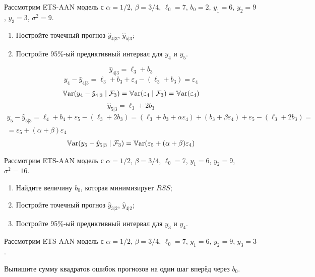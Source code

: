 \begin{problem}
  Рассмотрим ETS-AAN модель с $\alpha = 1/2$, $\beta=3/4$, $\ell_{0}=7$, $b_0=2$, $y_1=6$, $y_2=9$, $y_3=3$, $\sigma^2=9$.
  \begin{enumerate}
    \item Постройте точечный прогноз $\hat y_{4|3}$, $\hat y_{5|3}$;
    \item Постройте 95\%-ый предиктивный интервал для $y_{4}$ и $y_{5}$.
  \end{enumerate}
\begin{sol}
\[
\hat y_{4|3} = \ell_3 + b_3
\]
\[
y_4 - \hat y_{4|3} = \ell_3 + b_3 + \varepsilon_4 - (\ell_3 + b_3) = \varepsilon_4  
\]
\[
\operatorname{\mathbb{V}\mathrm{ar}}(y_4 - \hat y_{4|3} \mid \mathcal{F}_3) = \operatorname{\mathbb{V}\mathrm{ar}}(\varepsilon_4 \mid \mathcal{F}_3) = \operatorname{\mathbb{V}\mathrm{ar}}(\varepsilon_4)  
\]
\[
\hat y_{5|3} = \ell_3 + 2b_3
\]
\begin{multline}
y_5 - \hat y_{5|3} = \ell_4 + b_4 + \varepsilon_5 - (\ell_3 + 2b_3) = (\ell_3 + b_3 + \alpha \varepsilon_4)  + 
(b_3 + \beta \varepsilon_4) + \varepsilon_5 - (\ell_3 + 2b_3) = \\
= \varepsilon_5 + (\alpha + \beta) \varepsilon_4 
\end{multline}
\[
\operatorname{\mathbb{V}\mathrm{ar}}(y_5 - \hat y_{5|3} \mid \mathcal{F}_3) = \operatorname{\mathbb{V}\mathrm{ar}}(\varepsilon_5 + (\alpha + \beta) \varepsilon_4 )  
\]
\end{sol}
\end{problem}

\begin{problem}
  Рассмотрим ETS-AAN модель с $\alpha = 1/2$, $\beta=3/4$, $\ell_{0}=7$, $y_1=6$, $y_2=9$, $\sigma^2=16$.


  \begin{enumerate}
    \item Найдите величину $b_0$, которая минимизирует $RSS$;
    \item Постройте точечный прогноз $\hat y_{3|2}$, $\hat y_{4|2}$;
     \item Постройте 95\%-ый предиктивный интервал для $y_{3}$ и $y_{4}$.
  \end{enumerate}
\begin{sol}
\end{sol}
\end{problem}

\begin{problem}
  Рассмотрим ETS-AAN модель с $\alpha = 1/2$, $\beta=3/4$, $\ell_{0}=7$, $y_1=6$, $y_2=9$, $y_3=3$.

  Выпишите сумму квадратов ошибок прогнозов на один шаг вперёд через $b_0$.
\begin{sol}
\end{sol}
\end{problem}



